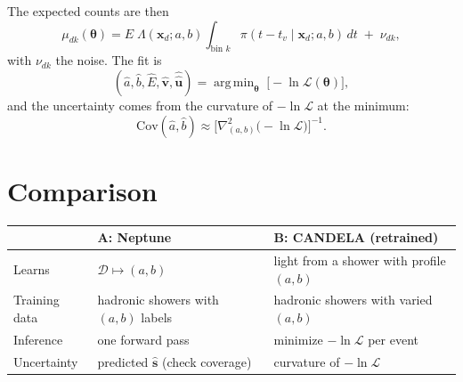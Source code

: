 \documentclass[11pt]{article}
\newcommand{\D}{\mathcal{D}}
\DeclareMathOperator*{\argmin}{arg\,min}
\begin{document}
The expected counts are then
\begin{equation}
  \mu_{dk}(\bm{\theta}) = E\; \Lambda(\bm{x}_d; a,b) \int_{\text{bin } k} \pi(t - t_v \mid \bm{x}_d; a,b)\, dt
  \;+\; \nu_{dk},
\end{equation}
with $\nu_{dk}$ the noise. The fit is
\begin{equation}
  (\hat a, \hat b, \hat E, \hat{\bm{v}}, \hat{\hat{\bm{u}}}) = \argmin_{\bm{\theta}}\; \big[-\ln\mathcal{L}(\bm{\theta})\big],
\end{equation}
and the uncertainty comes from the curvature of $-\ln\mathcal{L}$ at the minimum:
\begin{equation}
  \mathrm{Cov}(\hat a, \hat b) \approx \Big[\nabla^2_{(a,b)}\big(-\ln\mathcal{L}\big)\Big]^{-1}.
\end{equation}

\section{Comparison}
\begin{center}
\begin{tabular}{lll}
\hline
 & A: Neptune & B: CANDELA (retrained) \\
\hline
Learns & $\D \mapsto (a,b)$ & light from a shower with profile $(a,b)$ \\
Training data & hadronic showers with $(a,b)$ labels & hadronic showers with varied $(a,b)$ \\
Inference & one forward pass & minimize $-\ln\mathcal{L}$ per event \\
Uncertainty & predicted $\hat{\bm{s}}$ (check coverage) & curvature of $-\ln\mathcal{L}$ \\
\hline
\end{tabular}
\end{center}
\end{document}
